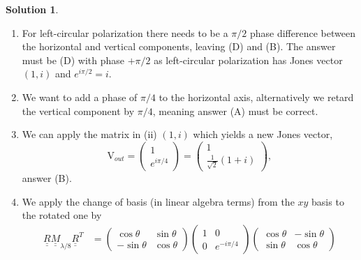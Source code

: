 \documentclass[10pt]{article}
\theoremstyle{definition}
\newtheorem{soln}{Solution}
\newcommand{\bv}[1]{\bm{\mathrm{#1}}}
\newcommand{\dul}[1]{\underline{\underline{#1}}}
\begin{document}
\begin{soln}~
  \begin{enumerate}[label=(\roman*)]
    \item For left-circular polarization there needs to be a $\pi/2$ phase difference between the horizontal and vertical components, leaving (D) and (B).
          The answer must be (D) with phase $+\pi/2$ as left-circular polarization has Jones vector $(1,i)$ and $e^{i\pi/2}=i$.
    \item We want to add a phase of $\pi/4$ to the horizontal axis, alternatively we retard the vertical component by $\pi/4$, meaning answer (A)
          must be correct.
    \item We can apply the matrix in (ii) $(1,i)$ which yields a new Jones vector,
          $$\bv{V}_{out}=\begin{pmatrix}
              1 \\
              e^{i\pi/4}
            \end{pmatrix}=\begin{pmatrix}
              1 \\
              \frac{1}{\sqrt{2}}\left(1+i\right)
            \end{pmatrix},$$
          answer (B).
    \item We apply the change of basis (in linear algebra terms) from the $xy$ basis to the rotated one by
          \begin{align*}
            \dul{R}\dul{M}_{\lambda/8}\dul{R}^T & =\begin{pmatrix}
                                                     \cos\theta  & \sin\theta \\
                                                     -\sin\theta & \cos\theta
                                                   \end{pmatrix}\begin{pmatrix}
                                                                  1 & 0           \\
                                                                  0 & e^{-i\pi/4}
                                                                \end{pmatrix}\begin{pmatrix}
                                                                               \cos\theta & -\sin\theta \\
                                                                               \sin\theta & \cos\theta
                                                                             \end{pmatrix} \\

\end{align*}
\end{enumerate}
\end{soln}
\end{document}
